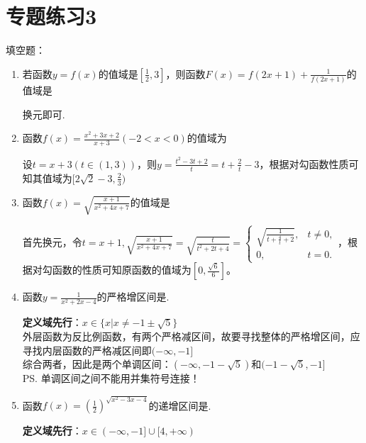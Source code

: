 \chapter*{专题练习3}
填空题：
\begin{enumerate}
    \item 若函数$y = f(x)$的值域是$[\frac{1}{2}, 3]$，则函数$F(x) = f(2x+1) + \frac{1}{f(2x+1)}$的值域是\blkda{$[2, \frac{10}{3}]$}
    \begin{jieda}
        换元即可.
    \end{jieda}
    \item 函数$f(x) = \frac{x^2 + 3x + 2}{x+3} (-2<x<0)$的值域为\blkda[2]{$[2\sqrt{2}-3, \frac{2}{3})$}
    \begin{jieda}
        设$t = x+3 (t \in (1, 3))$，则$y = \frac{t^2-3t+2}{t} = t + \frac{2}{t} - 3$，根据对勾函数性质可知其值域为$[2\sqrt{2}-3, \frac{2}{3})$
    \end{jieda}
    \item 函数$f(x) = \sqrt{\frac{x+1}{x^2+4x+7}}$的值域是
    \begin{jieda}
        首先换元，令$t = x+1, \sqrt{\frac{x+1}{x^2+4x+7}} = \sqrt{\frac{t}{t^2 + 2t + 4}} =  \left\{ 
         \begin{array}{ll}  
            \sqrt{\frac{1}{t + \frac{4}{t} + 2}}, & t \neq 0, \\ 
            0, & t = 0.
         \end{array}
        \right. $，根据对勾函数的性质可知原函数的值域为$[0, \frac{\sqrt{6}}{6}]$。
    \end{jieda}
    \item 函数$y = \frac{1}{x^2+2x-4}$的严格增区间是\blkda[5.5]{$(-\infty,-1-\sqrt{5})$和$(-1-\sqrt{5}, -1]$}. 
    \begin{jieda}
        \textbf{定义域先行}：$x \in \{x | x \neq -1\pm \sqrt{5}\}$ \\
        外层函数为反比例函数，有两个严格减区间，故要寻找整体的严格增区间，应寻找内层函数的严格减区间即$(-\infty,-1]$ \\
        综合两者，因此是两个单调区间：$(-\infty,-1-\sqrt{5})$和$(-1-\sqrt{5}, -1]$ \\
        \ps 单调区间之间不能用并集符号连接！
    \end{jieda}
    \item 函数$f(x) = (\frac{1}{2})^{\sqrt{x^2-3x-4}}$的递增区间是\blkda[3]{$(-\infty, -1]$}. 
    \begin{jieda}
        \textbf{定义域先行}：$x \in (-\infty, -1] \cup [4, +\infty)$ \\

\end{jieda}
\end{enumerate}
